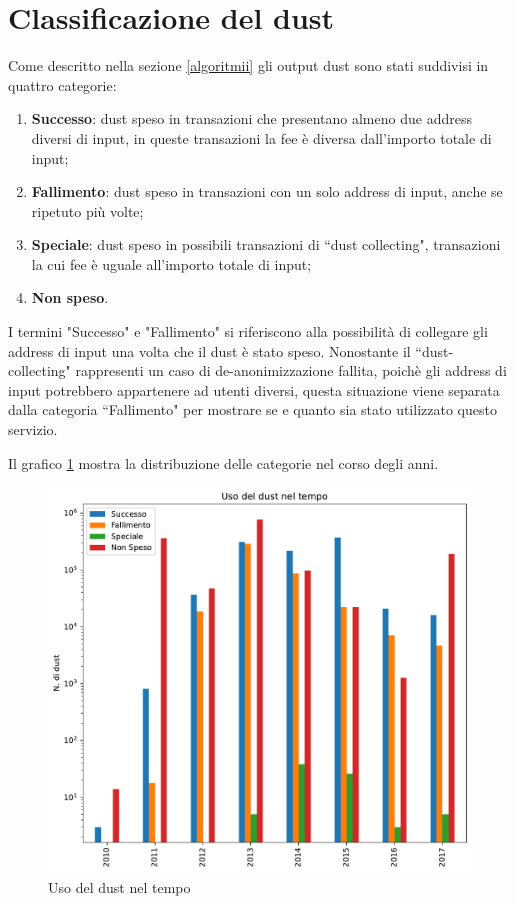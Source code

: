 \section{Classificazione del dust}
Come descritto nella sezione \ref{algoritmii} gli output dust sono stati suddivisi in quattro categorie:
\begin{enumerate}
    \item \textbf{Successo}: dust speso in transazioni che presentano almeno due address diversi di input, in queste transazioni la fee è diversa dall'importo totale di input;
    \item \textbf{Fallimento}: dust speso in transazioni con un solo address di input, anche se ripetuto più volte;
    \item \textbf{Speciale}: dust speso in possibili transazioni di ``dust collecting", transazioni la cui fee è uguale all'importo totale di input;
    \item \textbf{Non speso}.
\end{enumerate}

I termini "Successo" e "Fallimento" si riferiscono alla possibilità di collegare gli address di input una volta che il dust è stato speso. Nonostante il ``dust-collecting" rappresenti un caso di de-anonimizzazione fallita, poichè gli address di input potrebbero appartenere ad utenti diversi, questa situazione viene separata dalla categoria ``Fallimento" per mostrare se e quanto sia stato utilizzato questo servizio.

Il grafico \ref{fig:dust_year} mostra la distribuzione delle categorie nel corso degli anni.
\begin{figure}[h!]
    \centering
    \includegraphics[scale=0.6]{Grafici/uso_del_dust_new.pdf}
    \caption{Uso del dust nel tempo}
    \label{fig:dust_year}
\end{figure}
\FloatBarrier

